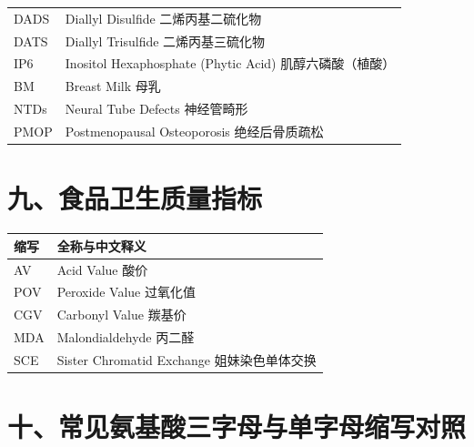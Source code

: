 \begin{table}[H]
\begin{tabularx}{\textwidth}{lX}
DADS & Diallyl Disulfide \hfill 二烯丙基二硫化物 \\
DATS & Diallyl Trisulfide \hfill 二烯丙基三硫化物 \\
IP6 & Inositol Hexaphosphate (Phytic Acid) \hfill 肌醇六磷酸（植酸） \\
BM & Breast Milk \hfill 母乳 \\
NTDs & Neural Tube Defects \hfill 神经管畸形 \\
PMOP & Postmenopausal Osteoporosis \hfill 绝经后骨质疏松 \\
\bottomrule
\end{tabularx}
\end{table}

\section{九、食品卫生质量指标}

\begin{table}[H]
\centering
\begin{tabularx}{\textwidth}{lX}
\toprule
\textbf{缩写} & \textbf{全称与中文释义} \\
\midrule
AV & Acid Value \hfill 酸价 \\
POV & Peroxide Value \hfill 过氧化值 \\
CGV & Carbonyl Value \hfill 羰基价 \\
MDA & Malondialdehyde \hfill 丙二醛 \\
SCE & Sister Chromatid Exchange \hfill 姐妹染色单体交换 \\
\bottomrule
\end{tabularx}
\end{table}

\section{十、常见氨基酸三字母与单字母缩写对照}

